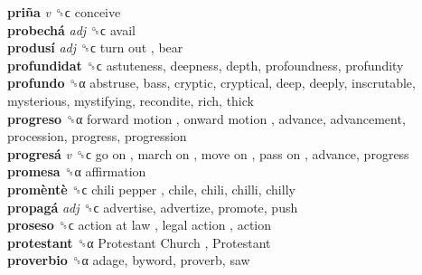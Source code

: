 \textbf{priña} \emph{v}  ␝ϲ  conceive  \\
\textbf{probechá} \emph{adj}  ␝ϲ  avail  \\
\textbf{produsí} \emph{adj}  ␝ϲ   turn out , bear  \\
\textbf{profundidat} ␝ϲ  astuteness, deepness, depth, profoundness, profundity  \\
\textbf{profundo} ␝α  abstruse, bass, cryptic, cryptical, deep, deeply, inscrutable, mysterious, mystifying, recondite, rich, thick  \\
\textbf{progreso} ␝α   forward motion ,  onward motion , advance, advancement, procession, progress, progression  \\
\textbf{progresá} \emph{v}  ␝ϲ   go on ,  march on ,  move on ,  pass on , advance, progress  \\
\textbf{promesa} ␝α  affirmation  \\
\textbf{promèntè} ␝ϲ   chili pepper , chile, chili, chilli, chilly  \\
\textbf{propagá} \emph{adj}  ␝ϲ  advertise, advertize, promote, push  \\
\textbf{proseso} ␝ϲ   action at law ,  legal action , action  \\
\textbf{protestant} ␝α   Protestant Church ,  Protestant   \\
\textbf{proverbio} ␝α  adage, byword, proverb, saw  \\
